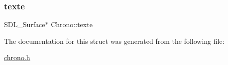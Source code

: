 \mbox{\label{structChrono_aa9e2794c88d9bc44f89aca45c4d7c55a}} 
\subsubsection{\texorpdfstring{texte}{texte}}
{\footnotesize\ttfamily S\+D\+L\+\_\+\+Surface$\ast$ Chrono\+::texte}



The documentation for this struct was generated from the following file\+:\begin{DoxyCompactItemize}
\item 
\hyperlink{chrono_8h}{chrono.\+h}\end{DoxyCompactItemize}
